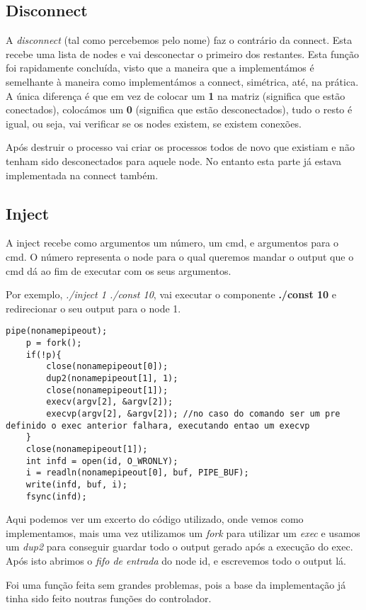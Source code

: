 \documentclass{article}
\begin{document}
\subsection{Disconnect}
\par A \emph{disconnect} (tal como percebemos pelo nome) faz o contrário da connect. Esta recebe uma lista de nodes e vai desconectar o primeiro dos restantes. Esta função foi rapidamente concluída, visto que a maneira que a implementámos é semelhante à maneira como implementámos a connect, simétrica, até, na prática. A única diferença é que em vez de colocar um \textbf{1} na matriz (significa que estão conectados), colocámos um \textbf{0} (significa que estão desconectados), tudo o resto é igual, ou seja, vai verificar se os nodes existem, se existem conexões.
\par Após destruir o processo vai criar os processos todos de novo que existiam e não tenham sido desconectados para aquele node. No entanto esta parte já estava implementada na connect também.

\subsection{Inject}
\par A inject recebe como argumentos um número, um cmd, e argumentos para o cmd. O número representa o node para o qual queremos mandar o output que o cmd dá ao fim de executar com os seus argumentos.
\par Por exemplo, \emph{./inject 1 ./const 10}, vai executar o componente \textbf{./const 10} e redirecionar o seu output para o node 1.
\begin{lstlisting}
pipe(nonamepipeout);
    p = fork();
    if(!p){
        close(nonamepipeout[0]);
        dup2(nonamepipeout[1], 1);
        close(nonamepipeout[1]);
        execv(argv[2], &argv[2]);
        execvp(argv[2], &argv[2]); //no caso do comando ser um pre definido o exec anterior falhara, executando entao um execvp
    }
    close(nonamepipeout[1]);
    int infd = open(id,	O_WRONLY);
    i = readln(nonamepipeout[0], buf, PIPE_BUF);
	write(infd, buf, i);
	fsync(infd);
\end{lstlisting}

\par Aqui podemos ver um excerto do código utilizado, onde vemos como implementamos, mais uma vez utilizamos um \emph{fork} para utilizar um \emph{exec} e usamos um \emph{dup2} para conseguir guardar todo o output gerado após a execução do exec. Após isto abrimos o \emph{fifo de entrada} do node id, e escrevemos todo o output lá.
\par Foi uma função feita sem grandes problemas, pois a base da implementação já tinha sido feito noutras funções do controlador.
\end{document}
